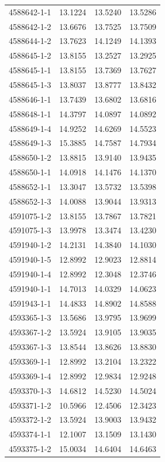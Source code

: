 \begin{longtable}{lrrr}
4588642-1-1 & 13.1224 & 13.5240 & 13.5286 \\
4588642-1-2 & 13.6676 & 13.7525 & 13.7509 \\
4588644-1-2 & 13.7623 & 14.1249 & 14.1393 \\
4588645-1-2 & 13.8155 & 13.2527 & 13.2925 \\
4588645-1-1 & 13.8155 & 13.7369 & 13.7627 \\
4588645-1-3 & 13.8037 & 13.8777 & 13.8432 \\
4588646-1-1 & 13.7439 & 13.6802 & 13.6816 \\
4588648-1-1 & 14.3797 & 14.0897 & 14.0892 \\
4588649-1-4 & 14.9252 & 14.6269 & 14.5523 \\
4588649-1-3 & 15.3885 & 14.7587 & 14.7934 \\
4588650-1-2 & 13.8815 & 13.9140 & 13.9435 \\
4588650-1-1 & 14.0918 & 14.1476 & 14.1370 \\
4588652-1-1 & 13.3047 & 13.5732 & 13.5398 \\
4588652-1-3 & 14.0088 & 13.9044 & 13.9313 \\
4591075-1-2 & 13.8155 & 13.7867 & 13.7821 \\
4591075-1-3 & 13.9978 & 13.3474 & 13.4230 \\
4591940-1-2 & 14.2131 & 14.3840 & 14.1030 \\
4591940-1-5 & 12.8992 & 12.9023 & 12.8814 \\
4591940-1-4 & 12.8992 & 12.3048 & 12.3746 \\
4591940-1-1 & 14.7013 & 14.0329 & 14.0623 \\
4591943-1-1 & 14.4833 & 14.8902 & 14.8588 \\
4593365-1-3 & 13.5686 & 13.9795 & 13.9699 \\
4593367-1-2 & 13.5924 & 13.9105 & 13.9035 \\
4593367-1-3 & 13.8544 & 13.8626 & 13.8830 \\
4593369-1-1 & 12.8992 & 13.2104 & 13.2322 \\
4593369-1-4 & 12.8992 & 12.9834 & 12.9248 \\
4593370-1-3 & 14.6812 & 14.5230 & 14.5024 \\
4593371-1-2 & 10.5966 & 12.4506 & 12.3423 \\
4593372-1-2 & 13.5924 & 13.9003 & 13.9432 \\
4593374-1-1 & 12.1007 & 13.1509 & 13.1430 \\
4593375-1-2 & 15.0034 & 14.6404 & 14.6463 \\

\end{longtable}
